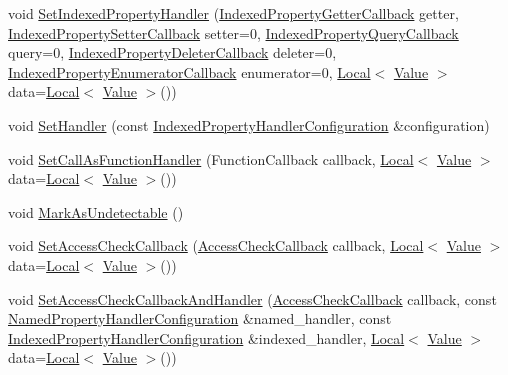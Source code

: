 \begin{DoxyCompactItemize}
\item 
void \mbox{\hyperlink{classv8_1_1ObjectTemplate_ae3303f3d55370684ac02b02e67712eac}{Set\+Indexed\+Property\+Handler}} (\mbox{\hyperlink{namespacev8_a48e7816ba64447bf32a25d194588daaf}{Indexed\+Property\+Getter\+Callback}} getter, \mbox{\hyperlink{namespacev8_a4ac7cc6185ebc8b6a199f9fa8e6bf5c3}{Indexed\+Property\+Setter\+Callback}} setter=0, \mbox{\hyperlink{namespacev8_a980b62c33eb664783e61e25c3b27f9ee}{Indexed\+Property\+Query\+Callback}} query=0, \mbox{\hyperlink{namespacev8_a53863728de14cde48dd6543207b2f2da}{Indexed\+Property\+Deleter\+Callback}} deleter=0, \mbox{\hyperlink{namespacev8_adbb0a6d5537371953f9ba807d4f6275e}{Indexed\+Property\+Enumerator\+Callback}} enumerator=0, \mbox{\hyperlink{classv8_1_1Local}{Local}}$<$ \mbox{\hyperlink{classv8_1_1Value}{Value}} $>$ data=\mbox{\hyperlink{classv8_1_1Local}{Local}}$<$ \mbox{\hyperlink{classv8_1_1Value}{Value}} $>$())
\item 
void \mbox{\hyperlink{classv8_1_1ObjectTemplate_abc92c2889776a5a1ef6831f9c3da3783}{Set\+Handler}} (const \mbox{\hyperlink{structv8_1_1IndexedPropertyHandlerConfiguration}{Indexed\+Property\+Handler\+Configuration}} \&configuration)
\item 
void \mbox{\hyperlink{classv8_1_1ObjectTemplate_a1775c8f73e643c339804d2f5b628eddf}{Set\+Call\+As\+Function\+Handler}} (Function\+Callback callback, \mbox{\hyperlink{classv8_1_1Local}{Local}}$<$ \mbox{\hyperlink{classv8_1_1Value}{Value}} $>$ data=\mbox{\hyperlink{classv8_1_1Local}{Local}}$<$ \mbox{\hyperlink{classv8_1_1Value}{Value}} $>$())
\item 
void \mbox{\hyperlink{classv8_1_1ObjectTemplate_a7e40ef313b44c2ad336c73051523b4f8}{Mark\+As\+Undetectable}} ()
\item 
void \mbox{\hyperlink{classv8_1_1ObjectTemplate_a5b0337016cd89fc72f3a9d75399c2487}{Set\+Access\+Check\+Callback}} (\mbox{\hyperlink{namespacev8_a1024fb358d107c1494163217830688e6}{Access\+Check\+Callback}} callback, \mbox{\hyperlink{classv8_1_1Local}{Local}}$<$ \mbox{\hyperlink{classv8_1_1Value}{Value}} $>$ data=\mbox{\hyperlink{classv8_1_1Local}{Local}}$<$ \mbox{\hyperlink{classv8_1_1Value}{Value}} $>$())
\item 
void \mbox{\hyperlink{classv8_1_1ObjectTemplate_abb8302671bfb5d381f7415336f4e631d}{Set\+Access\+Check\+Callback\+And\+Handler}} (\mbox{\hyperlink{namespacev8_a1024fb358d107c1494163217830688e6}{Access\+Check\+Callback}} callback, const \mbox{\hyperlink{structv8_1_1NamedPropertyHandlerConfiguration}{Named\+Property\+Handler\+Configuration}} \&named\+\_\+handler, const \mbox{\hyperlink{structv8_1_1IndexedPropertyHandlerConfiguration}{Indexed\+Property\+Handler\+Configuration}} \&indexed\+\_\+handler, \mbox{\hyperlink{classv8_1_1Local}{Local}}$<$ \mbox{\hyperlink{classv8_1_1Value}{Value}} $>$ data=\mbox{\hyperlink{classv8_1_1Local}{Local}}$<$ \mbox{\hyperlink{classv8_1_1Value}{Value}} $>$())

\end{DoxyCompactItemize}

